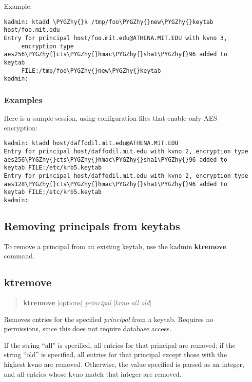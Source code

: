 \documentclass[letterpaper,10pt,english]{sphinxmanual}
\def\PYGZhy{\char`\-}
\begin{document}
Example:

\begin{Verbatim}[commandchars=\\\{\}]
kadmin: ktadd \PYGZhy{}k /tmp/foo\PYGZhy{}new\PYGZhy{}keytab host/foo.mit.edu
Entry for principal host/foo.mit.edu@ATHENA.MIT.EDU with kvno 3,
     encryption type aes256\PYGZhy{}cts\PYGZhy{}hmac\PYGZhy{}sha1\PYGZhy{}96 added to keytab
     FILE:/tmp/foo\PYGZhy{}new\PYGZhy{}keytab
kadmin:
\end{Verbatim}


\subsubsection{Examples}
\label{admin/appl_servers:examples}
Here is a sample session, using configuration files that enable only
AES encryption:

\begin{Verbatim}[commandchars=\\\{\}]
kadmin: ktadd host/daffodil.mit.edu@ATHENA.MIT.EDU
Entry for principal host/daffodil.mit.edu with kvno 2, encryption type aes256\PYGZhy{}cts\PYGZhy{}hmac\PYGZhy{}sha1\PYGZhy{}96 added to keytab FILE:/etc/krb5.keytab
Entry for principal host/daffodil.mit.edu with kvno 2, encryption type aes128\PYGZhy{}cts\PYGZhy{}hmac\PYGZhy{}sha1\PYGZhy{}96 added to keytab FILE:/etc/krb5.keytab
kadmin:
\end{Verbatim}


\subsection{Removing principals from keytabs}
\label{admin/appl_servers:removing-principals-from-keytabs}
To remove a principal from an existing keytab, use the kadmin
\textbf{ktremove} command.


\subsection{ktremove}
\label{admin/appl_servers:ktremove}\begin{quote}

\textbf{ktremove} {[}options{]} \emph{principal} {[}\emph{kvno} \textbar{} \emph{all} \textbar{} \emph{old}{]}
\end{quote}

Removes entries for the specified \emph{principal} from a keytab.  Requires
no permissions, since this does not require database access.

If the string ``all'' is specified, all entries for that principal are
removed; if the string ``old'' is specified, all entries for that
principal except those with the highest kvno are removed.  Otherwise,
the value specified is parsed as an integer, and all entries whose
kvno match that integer are removed.
\end{document}
